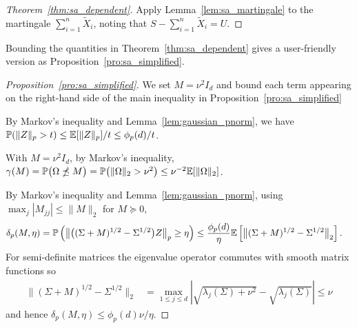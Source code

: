\begin{proof}[Theorem~\ref{thm:sa_dependent}]
  Apply Lemma~\ref{lem:sa_martingale} to
  the martingale $\sum_{i=1}^{n} \tilde X_i$,
  noting that $S - \sum_{i=1}^{n} \tilde X_i = U$.
\end{proof}

Bounding the quantities
in Theorem~\ref{thm:sa_dependent} gives a
user-friendly version as Proposition~\ref{pro:sa_simplified}.

\begin{proof}[Proposition~\ref{pro:sa_simplified}]

  We set $M = \nu^2 I_d$ and
  bound each term appearing on the right-hand side of
  the main inequality in Proposition~\ref{pro:sa_simplified}


  By Markov's inequality and Lemma~\ref{lem:gaussian_pnorm},
  we have
  $\mathbb{P}( \|Z\|_p > t ) \leq \mathbb{E}[\|Z\|_p] / t \leq \phi_p(d) / t$.


  With $M = \nu^2 I_d$,
  by Markov's inequality,
  $\gamma(M) = \mathbb{P}\big(\Omega \npreceq M\big)
  = \mathbb{P}\big(\|\Omega\|_2 > \nu^2 \big)
  \leq \nu^{-2} \mathbb{E}[\|\Omega\|_2]$.


  By Markov's inequality and Lemma~\ref{lem:gaussian_pnorm},
  using
  $\max_j |M_{j j}| \leq \|M\|_2$
  for $M \succeq 0$,
  \begin{align*}
    \delta_{p}(M,\eta)
    &= \mathbb{P}\left(
      \big\|\big((\Sigma +M)^{1/2}- \Sigma^{1/2}\big) Z\big\|_p
      \geq \eta
    \right)
    \leq \frac{\phi_p(d)} {\eta}
    \mathbb{E} \left[
      \big\|(\Sigma +M)^{1/2}- \Sigma^{1/2}\big\|_2
    \right].
  \end{align*}
  For semi-definite matrices
  the eigenvalue operator commutes with smooth matrix functions so
  \begin{align*}
    \|(\Sigma +M)^{1/2}- \Sigma^{1/2}\|_2
    &=
    \max_{1 \leq j \leq d}
    \left|
    \sqrt{\lambda_j(\Sigma) + \nu^2} - \sqrt{\lambda_j(\Sigma)}
    \right|
    \leq \nu
  \end{align*}
  and hence $\delta_{p}(M,\eta) \leq \phi_p(d)\nu / \eta$.



\end{proof}
